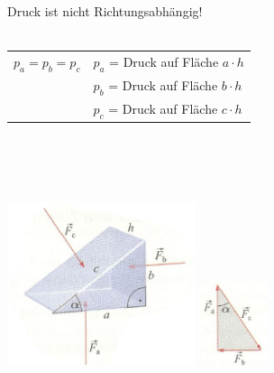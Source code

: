 		\newline
		\newline
		\newline
		\newline
		\begin{minipage}[t]{11.5cm}
				\newline
				Druck ist nicht Richtungsabhängig!\\ \\
				\renewcommand{\arraystretch}{1.5}
				\begin{tabular}{ p{4cm} | p{7cm}}
					$p_a = p_b = p_c$	&	$p_a$ = Druck auf Fläche $a \cdot h$\\
					&	$p_b$ = Druck auf Fläche $b \cdot h$\\
					&	$p_c$ = Druck auf Fläche $c\cdot h$\\
				\end{tabular}\\ \\ \\
		\end{minipage}
		\begin{minipage}[t]{10cm}
			\vspace{-\ht\strutbox}\includegraphics[width=5.5cm]{./bilder/GesetzVonPascal1.jpg}
			\vspace{-\ht\strutbox}\includegraphics[width=2cm]{./bilder/GesetzVonPascal2.jpg}
		\end{minipage}
	\newpage
